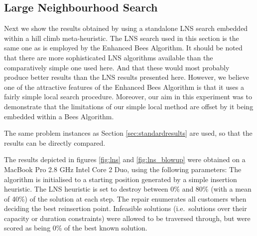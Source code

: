 \subsection{Large Neighbourhood Search}
\label{subsec:largeneighbourhoodsearch}

Next we show the results obtained by using a standalone LNS search embedded within a hill climb meta-heuristic. The LNS search used in this section is the same one as is employed by the Enhanced Bees Algorithm. It should be noted that there are more sophisticated LNS algorithms available than the comparatively simple one used here. And that these would most probably produce better results than the LNS results presented here. However, we believe one of the attractive features of the Enhanced Bees Algorithm is that it uses a fairly simple local search procedure. Moreover, our aim in this experiment was to demonstrate that the limitations of our simple local method are offset by it being embedded within a Bees Algorithm.

The same problem instances as Section \ref{sec:standardresults} are used, so that the results can be directly compared.



The results depicted in figures \ref{fig:lns} and \ref{fig:lns_blowup} were obtained on a MacBook Pro 2.8 GHz Intel Core 2 Duo, using the following parameters: The algorithm is initialised to a starting position generated by a simple insertion heuristic. The LNS heuristic is set to destroy between 0\% and 80\% (with a mean of 40\%) of the solution at each step. The repair enumerates all customers when deciding the best reinsertion point. Infeasible solutions (i.e.~solutions over their capacity or duration constraints) were allowed to be traversed through, but were scored as being 0\% of the best known solution.

